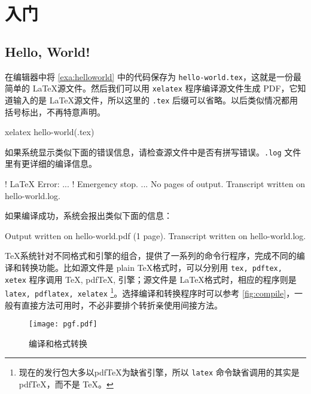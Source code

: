 \chapter{入门}

\section{Hello, World!}
\begin{example}[h]
\caption{Hello, World!}
\label{exa:helloworld}
\end{example}

在编辑器中将 \autoref{exa:helloworld} 中的代码保存为 \verb|hello-world.tex|，这就是一份最简单的 \LaTeX 源文件。然后我们可以用 \texttt{xelatex} 程序编译源文件生成 PDF，它知道输入的是 \LaTeX 源文件，所以这里的 \texttt{.tex} 后缀可以省略。以后类似情况都用括号标出，不再特意声明。

\begin{Code}[]
xelatex hello-world(.tex)
\end{Code}

如果系统显示类似下面的错误信息，请检查源文件中是否有拼写错误。\texttt{.log} 文件里有更详细的编译信息。

\begin{Code}[numbers=left]
! LaTeX Error:
...
! Emergency stop.
...
No pages of output.
Transcript written on hello-world.log.
\end{Code}

如果编译成功，系统会报出类似下面的信息：

\begin{Code}[]
Output written on hello-world.pdf (1 page).
Transcript written on hello-world.log.
\end{Code}

\TeX 系统针对不同格式和引擎的组合，提供了一系列的命令行程序，完成不同的编译和转换功能。比如源文件是 plain \TeX 格式时，可以分别用 \texttt{tex, pdftex, xetex} 程序调用 \TeX, pdfTeX, \XeTeX 引擎；源文件是 \LaTeX 格式时，相应的程序则是 \texttt{latex, pdflatex, xelatex} \footnote{现在的发行包大多以pdfTeX为缺省引擎，所以 \texttt{latex} 命令缺省调用的其实是 pdfTeX，而不是 \TeX 。}。选择编译和转换程序时可以参考 \autoref{fig:compile}，一般有直接方法可用时，不必非要排个转折亲使用间接方法。

\begin{figure}[htbp]
\centering
\texttt{[image: pgf.pdf]}
\caption{编译和格式转换}
\label{fig:compile}
\end{figure}

